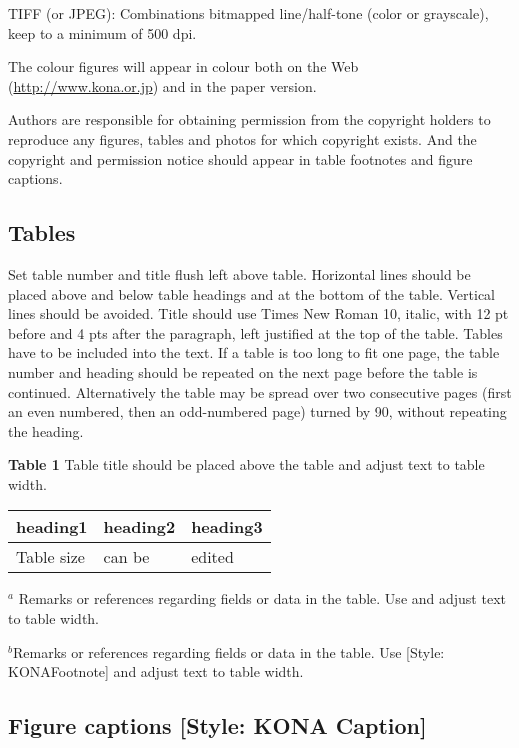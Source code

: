 \documentclass[twocolumn, 10pt]{article}
\begin{document}
TIFF (or JPEG): Combinations bitmapped line/half-tone (color or grayscale), keep to a minimum of 500 dpi.

The colour figures will appear in colour both on the Web (\underline{http://www.kona.or.jp}) and in the paper version. 

Authors are responsible for obtaining permission from the copyright holders to reproduce any figures, tables and photos for which copyright exists. And the copyright and permission notice should appear in table footnotes and figure captions. 

\subsection{Tables}

Set table number and title flush left above table. Horizontal lines should be placed above and below table headings and at the bottom of the table. Vertical lines should be avoided. Title should use Times New Roman 10, italic, with 12 pt before and 4 pts after the paragraph, left justified at the top of the table. Tables have to be included into the text. If a table is too long to fit one page, the table number and heading should be repeated on the next page before the table is continued. Alternatively the table may be spread over two consecutive pages (first an even numbered, then an odd-numbered page) turned by 90\textdegree , without repeating the heading.

\textbf{Table 1} Table title should be placed above the table and adjust 
text to table width.

\begin{table}[htbp]
\begin{center}
\begin{tabular}{lll}
\hline
heading1 & heading2& heading3  \\
\hline
Table size & can be & edited \\
\hline
\end{tabular}
\label{tab1}
\end{center}
$^{a}$ Remarks or references regarding fields or data in the table. Use and adjust text to table width.

$^{b }$Remarks or references regarding fields or data in the table. Use [Style: KONA\textunderscore Footnote] and adjust text to table width.
\end{table}



\subsection{Figure captions [Style: KONA Caption]}
\end{document}
